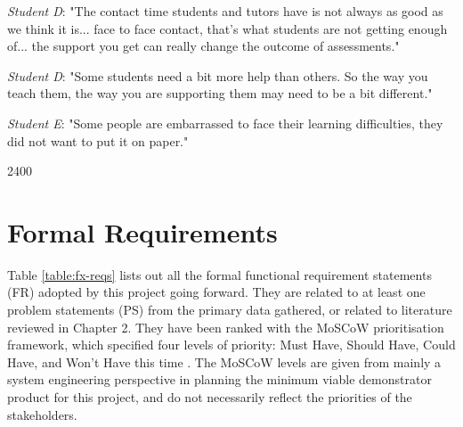 \textit{Student D}: "The contact time students and tutors have is not always as good as we think it is...
face to face contact, that's what students are not getting enough of... the support you get can really 
change the outcome of assessments."

\textit{Student D}: "Some students need a bit more help than others. So the way you teach them, 
the way you are supporting them may need to be a bit different."

\textit{Student E}: "Some people are embarrassed to face their learning difficulties, they did not want 
to put it on paper."

2400

\section{Formal Requirements}

Table \ref{table:fx-reqs} lists out all the formal functional requirement statements (FR) adopted by this 
project going forward. They are related to at least one problem statements (PS) from the primary data 
gathered, or related to literature reviewed in Chapter 2. They have been ranked with the MoSCoW prioritisation
framework, which specified four levels of priority: Must Have, Should Have, Could Have, and Won’t Have 
this time \citep{agile2018moscow}. The MoSCoW levels are given from mainly a system engineering perspective 
in planning the minimum viable demonstrator product for this project, and do not necessarily reflect 
the priorities of the stakeholders.

